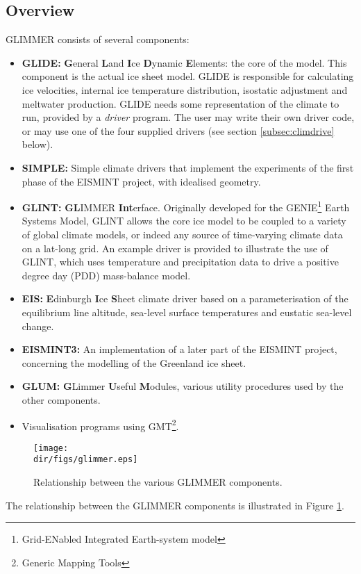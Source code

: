 \subsection{Overview}
%
GLIMMER consists of several components:
%
\begin{itemize}
\item {\bf GLIDE:} {\bf G}eneral {\bf L}and {\bf I}ce {\bf D}ynamic {\bf E}lements: the core of the model.  This component is the actual ice sheet model. GLIDE is responsible for calculating ice velocities, internal ice temperature distribution, isostatic adjustment and meltwater production. GLIDE needs some representation of the climate to run, provided by a {\it driver} program. The user may write their own driver code, or may use one of the four supplied drivers (see section \ref{subsec:climdrive} below).
\item {\bf SIMPLE:} Simple climate drivers that implement the experiments of the first phase of the EISMINT project, with idealised geometry.
\item {\bf GLINT:} {\bf GL}IMMER {\bf Int}erface. Originally developed for the GENIE\footnote{Grid-ENabled Integrated Earth-system model} Earth Systems Model, GLINT allows the core ice model to be coupled to a variety of global climate models, or indeed any source of time-varying climate data on a lat-long grid. An example driver is provided to illustrate the use of GLINT, which uses temperature and precipitation data to drive a positive degree day (PDD) mass-balance model.
\item {\bf EIS:} {\bf E}dinburgh {\bf I}ce {\bf S}heet climate driver based on a parameterisation of the equilibrium line altitude, sea-level surface temperatures and eustatic sea-level change.
\item {\bf EISMINT3:} An implementation of a later part of the EISMINT project, concerning the modelling of the Greenland ice sheet.
\item {\bf GLUM:} {\bf G}Limmer {\bf U}seful {\bf M}odules, various utility procedures used by the other components.
\item Visualisation programs using GMT\footnote{Generic Mapping Tools}.
\end{itemize}
%
\begin{figure}[htbp]
  \centering
  \texttt{[image: \\dir/figs/glimmer.eps]}
  \caption{Relationship between the various GLIMMER components.}
  \label{ug.fig.glimmer}
\end{figure}
The relationship between the GLIMMER components is illustrated in Figure \ref{ug.fig.glimmer}.
%
